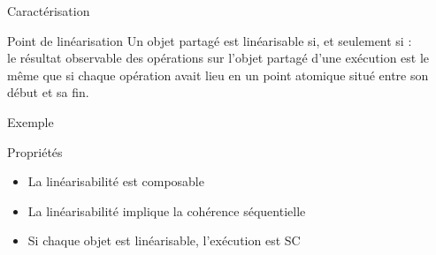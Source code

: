 
\begingroup

\begin{frame}{Caractérisation}

  \begin{block}{Point de linéarisation}
    Un objet partagé est linéarisable si, et seulement si : \\
    le résultat observable des opérations sur l'objet partagé d'une exécution est le même que si
    \alert{chaque opération avait lieu en un point atomique
      situé entre son début et sa fin.}
  \end{block}

  \begin{exampleblock}{Exemple}
    \begin{center}
    \end{center}
  \end{exampleblock}

  \begin{alertblock}{Propriétés}
    \begin{itemize}
    \item La linéarisabilité est composable
    \item La linéarisabilité implique la cohérence séquentielle
    \item Si chaque objet est linéarisable, l'exécution est SC
    \end{itemize}
  \end{alertblock}

\end{frame}

\endgroup
\endinput
